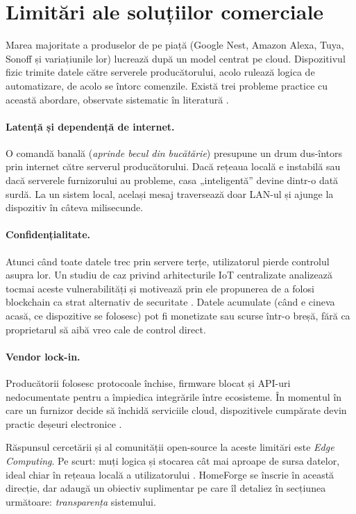 \section*{Limitări ale soluțiilor comerciale}
Marea majoritate a produselor de pe piață (Google Nest, Amazon Alexa, Tuya, Sonoff și variațiunile lor) lucrează după un model centrat pe cloud. Dispozitivul fizic trimite datele către serverele producătorului, acolo rulează logica de automatizare, de acolo se întorc comenzile. Există trei probleme practice cu această abordare, observate sistematic în literatură \cite{vendor_lockin_iot}.

\paragraph*{Latență și dependență de internet.} O comandă banală (\textit{aprinde becul din bucătărie}) presupune un drum dus-întors prin internet către serverul producătorului. Dacă rețeaua locală e instabilă sau dacă serverele furnizorului au probleme, casa „inteligentă” devine dintr-o dată surdă. La un sistem local, același mesaj traversează doar LAN-ul și ajunge la dispozitiv în câteva milisecunde.

\paragraph*{Confidențialitate.} Atunci când toate datele trec prin servere terțe, utilizatorul pierde controlul asupra lor. Un studiu de caz privind arhitecturile IoT centralizate analizează tocmai aceste vulnerabilități și motivează prin ele propunerea de a folosi blockchain ca strat alternativ de securitate \cite{dorri2017privacy}. Datele acumulate (când e cineva acasă, ce dispozitive se folosesc) pot fi monetizate sau scurse într-o breșă, fără ca proprietarul să aibă vreo cale de control direct.

\paragraph*{Vendor lock-in.} Producătorii folosesc protocoale închise, firmware blocat și API-uri nedocumentate pentru a împiedica integrările între ecosisteme. În momentul în care un furnizor decide să închidă serviciile cloud, dispozitivele cumpărate devin practic deșeuri electronice \cite{vendor_lockin_iot}.

Răspunsul cercetării și al comunității open-source la aceste limitări este \textit{Edge Computing}. Pe scurt: muți logica și stocarea cât mai aproape de sursa datelor, ideal chiar în rețeaua locală a utilizatorului \cite{edge_computing_iot_2020}. HomeForge se înscrie în această direcție, dar adaugă un obiectiv suplimentar pe care îl detaliez în secțiunea următoare: \textit{transparența} sistemului.

